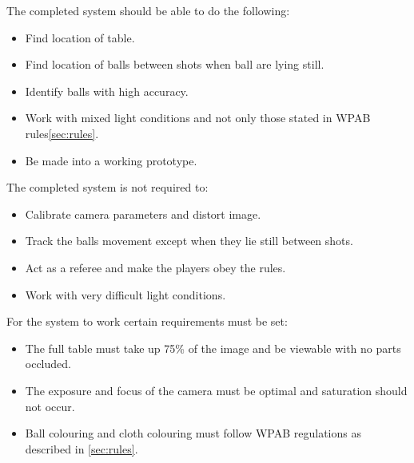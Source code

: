 The completed system should be able to do the following:

\begin{itemize}
\setlength{\itemsep}{0mm}
	\item Find location of table.
	\item Find location of balls between shots when ball are lying still.
	\item Identify balls with high accuracy.
	\item Work with mixed light conditions and not only those stated in WPAB rules\ref{sec:rules}.
	\item Be made into a working prototype.
\end{itemize}

The completed system is not required to:

\begin{itemize}
\setlength{\itemsep}{0mm}
	\item Calibrate camera parameters and distort image.
	\item Track the balls movement except when they lie still between shots.
	\item Act as a referee and make the players obey the rules.
	\item Work with very difficult light conditions.
\end{itemize}
For the system to work certain requirements must be set:

\begin{itemize}
\setlength{\itemsep}{0mm}
	\item The full table must take up 75\% of the image and  be viewable with no parts occluded.
	\item The exposure and focus of the camera must be optimal and saturation should not occur.
	\item Ball colouring and cloth colouring must follow WPAB regulations as described in \ref{sec:rules}.
\end{itemize}